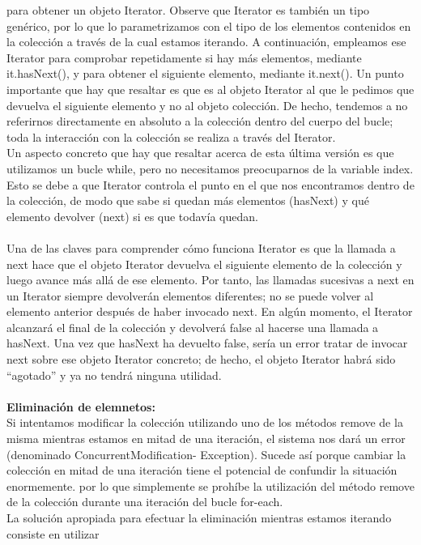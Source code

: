 \documentclass[11pt,a4paper]{article}
\begin{document}
	para obtener un objeto Iterator. Observe que Iterator es también un tipo genérico, por lo que
	lo parametrizamos con el tipo de los elementos contenidos en la colección a través de la cual estamos
	iterando. A continuación, empleamos ese Iterator para comprobar repetidamente si hay
	más elementos, mediante it.hasNext(), y para obtener el siguiente elemento, mediante it.next().
	Un punto importante que hay que resaltar es que es al objeto Iterator al que le pedimos que
	devuelva el siguiente elemento y no al objeto colección. De hecho, tendemos a no referirnos directamente
	en absoluto a la colección dentro del cuerpo del bucle; toda la interacción con la colección
	se realiza a través del Iterator.\\
	Un aspecto
	concreto que hay que resaltar acerca de esta última versión es que utilizamos un bucle while, pero
	no necesitamos preocuparnos de la variable index. Esto se debe a que Iterator controla el
	punto en el que nos encontramos dentro de la colección, de modo que sabe si quedan más elementos
	(hasNext) y qué elemento devolver (next) si es que todavía quedan.\\
	\\
	Una de las claves para comprender cómo funciona Iterator es que la llamada a next hace que
	el objeto Iterator devuelva el siguiente elemento de la colección y luego avance más allá de ese
	elemento. Por tanto, las llamadas sucesivas a next en un Iterator siempre devolverán elementos
	diferentes; no se puede volver al elemento anterior después de haber invocado next. En algún
	momento, el Iterator alcanzará el final de la colección y devolverá false al hacerse una llamada
	a hasNext. Una vez que hasNext ha devuelto false, sería un error tratar de invocar next sobre
	ese objeto Iterator concreto; de hecho, el objeto Iterator habrá sido “agotado” y ya no tendrá
	ninguna utilidad.
	\\
	\\
	\textbf{Eliminación de elemnetos:}\\
	Si intentamos
	modificar la colección utilizando uno de los métodos remove de la misma mientras estamos en
	mitad de una iteración, el sistema nos dará un error (denominado ConcurrentModification-
	Exception). Sucede así porque cambiar la colección en mitad de una iteración tiene el potencial
	de confundir la situación enormemente. por lo que simplemente se prohíbe la utilización del método remove de la colección
	durante una iteración del bucle for-each.\\
	La solución apropiada para efectuar la eliminación mientras estamos iterando consiste en utilizar
\end{document}
